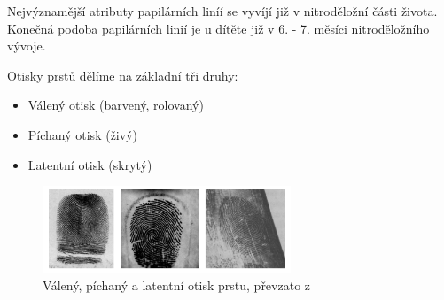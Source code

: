 Nejvýznamější atributy papilárních liníí se vyvíjí již v nitroděložní části života. Konečná podoba papilárních linií je u dítěte již v 6. - 7. měsíci nitroděložního vývoje. \cite{DrahanskyBrezinova}

Otisky prstů dělíme na základní tři druhy: \cite{Drahansky}
\begin{itemize}
\item Válený otisk (barvený, rolovaný)
\item Píchaný otisk (živý)
\item Latentní otisk (skrytý)
\end{itemize}

\begin{figure}[!htbp]
    \centering
    \includegraphics[width=280px]{obrazky-figures/druhyotisk.png}
    \caption{Válený, píchaný a latentní otisk prstu, převzato z \cite{Drahansky}}
\end{figure}

